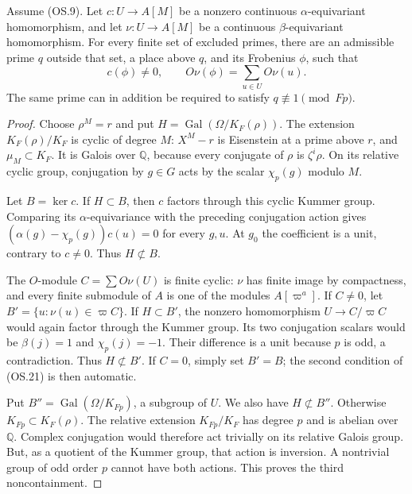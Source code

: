 \begin{proposition}
Assume (OS.9).  Let $c:U\to A[M]$ be a nonzero continuous
$\alpha$-equivariant homomorphism, and let
$\nu:U\to A[M]$ be a continuous $\beta$-equivariant homomorphism.
For every finite set of excluded primes, there are an admissible prime
$q$ outside that set, a place above $q$, and its Frobenius $\phi$, such
that
\[
       c(\phi)\ne0,\qquad
       O\nu(\phi)=\sum_{u\in U}O\nu(u).
 \tag{OS.21}
\]
The same prime can in addition be required to satisfy
$q\not\equiv1\pmod{Fp}$.
\end{proposition}
\begin{proof}
Choose $\rho^M=r$ and put $H=\operatorname{Gal}(\Omega/K_F(\rho))$.
The extension $K_F(\rho)/K_F$ is cyclic of degree $M$:
$X^M-r$ is Eisenstein at a prime above $r$, and $\mu_M\subset K_F$.
It is Galois over $\mathbb Q$, because every conjugate of $\rho$
is $\zeta^i\rho$.  On its relative cyclic group, conjugation by
$g\in G$ acts by the scalar $\chi_p(g)$ modulo $M$.

Let $B=\ker c$.  If $H\subset B$, then $c$ factors through this
cyclic Kummer group.  Comparing its $\alpha$-equivariance with
the preceding conjugation action gives
$(\alpha(g)-\chi_p(g))c(u)=0$ for every $g,u$.
At $g_0$ the coefficient is a unit, contrary to $c\ne0$.
Thus $H\not\subset B$.

The $O$-module $C=\sum O\nu(U)$ is finite cyclic: $\nu$ has finite
image by compactness, and every finite submodule of $A$ is one of
the modules $A[\varpi^a]$.
If $C\ne0$, let $B'=\{u:\nu(u)\in\varpi C\}$.
If $H\subset B'$, the nonzero homomorphism
$U\to C/\varpi C$ would again factor through the Kummer group.
Its two conjugation scalars would be $\beta(j)=1$ and
$\chi_p(j)=-1$.  Their difference is a unit because $p$ is odd,
a contradiction.  Thus $H\not\subset B'$.
If $C=0$, simply set $B'=B$; the second condition of (OS.21) is
then automatic.

Put $B''=\operatorname{Gal}(\Omega/K_{Fp})$, a subgroup of $U$.
We also have $H\not\subset B''$.
Otherwise $K_{Fp}\subset K_F(\rho)$.  The relative extension
$K_{Fp}/K_F$ has degree $p$ and is abelian over $\mathbb Q$.
Complex conjugation would therefore act trivially on its relative
Galois group.  But, as a quotient of the Kummer group, that action
is inversion.  A nontrivial group of odd order $p$ cannot have
both actions.  This proves the third noncontainment.


\end{proof}
